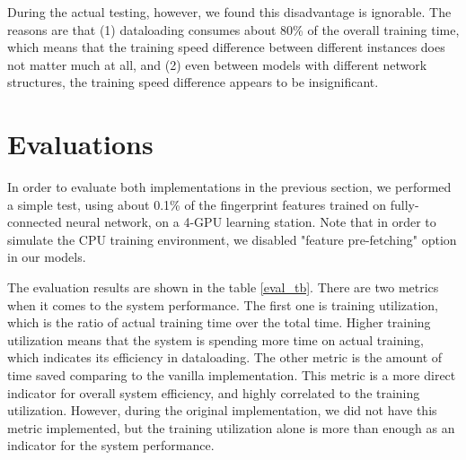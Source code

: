 \documentclass[conference]{IEEEtran}
\begin{document}
During the actual testing, however, we found this disadvantage is ignorable. The reasons are that (1) dataloading consumes about 80\% of the overall training time, which means that the training speed difference between different instances does not matter much at all, and (2) even between models with different network structures, the training speed difference appears to be insignificant. 

\section{Evaluations} \label{sec_eval}

In order to evaluate both implementations in the previous section, we performed a simple test, using about 0.1\% of the fingerprint features trained on fully-connected neural network, on a 4-GPU learning station. 
Note that in order to simulate the CPU training environment, we disabled "feature pre-fetching" option in our models. 

The evaluation results are shown in the table \ref{eval_tb}. 
There are two metrics when it comes to the system performance. 
The first one is training utilization, which is the ratio of actual training time over the total time. 
Higher training utilization means that the system is spending more time on actual training, which indicates its efficiency in dataloading. 
The other metric is the amount of time saved comparing to the vanilla implementation. 
This metric is a more direct indicator for overall system efficiency, and highly correlated to the training utilization. 
However, during the original implementation, we did not have this metric implemented, but the training utilization alone is more than enough as an indicator for the system performance. 
\end{document}

